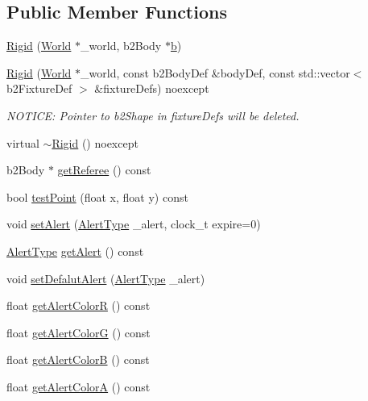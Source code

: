 \subsection*{Public Member Functions}
\begin{DoxyCompactItemize}
\item 
\hyperlink{classRigid_ac249369d4485986e4c637a056be455cf}{Rigid} (\hyperlink{classWorld}{World} $\ast$\+\_\+world, b2\+Body $\ast$\hyperlink{image_8h_ab2d05693952610f937e5acb3c4a8fa1b}{b})
\item 
\hyperlink{classRigid_a0c296ee872fecc99caf4701fd0e23c39}{Rigid} (\hyperlink{classWorld}{World} $\ast$\+\_\+world, const b2\+Body\+Def \&body\+Def, const std\+::vector$<$ b2\+Fixture\+Def $>$ \&fixture\+Defs) noexcept
\begin{DoxyCompactList}\small\item\em N\+O\+T\+I\+C\+E\+: Pointer to b2\+Shape in fixture\+Defs will be deleted. \end{DoxyCompactList}\item 
virtual \hyperlink{classRigid_a33b822e753d001badc4edcd143b02b92}{$\sim$\+Rigid} () noexcept
\item 
b2\+Body $\ast$ \hyperlink{classRigid_a2d8debf925c74a25547cfb1c695d6c7b}{get\+Referee} () const 
\item 
bool \hyperlink{classRigid_a9cb1affc6045f4bb56fb6c5fea51a374}{test\+Point} (float x, float y) const 
\item 
void \hyperlink{classRigid_a331f9af4f9ff0c701bed05c87da1f809}{set\+Alert} (\hyperlink{const_8h_ae57fbba2739adb4045db3bfcf9b249bf}{Alert\+Type} \+\_\+alert, clock\+\_\+t expire=0)
\item 
\hyperlink{const_8h_ae57fbba2739adb4045db3bfcf9b249bf}{Alert\+Type} \hyperlink{classRigid_a82007cd4cea29355f1f34479cd4aae49}{get\+Alert} () const 
\item 
void \hyperlink{classRigid_a1ad83f3f9bb440deef6b5b0c74bd8ff3}{set\+Defalut\+Alert} (\hyperlink{const_8h_ae57fbba2739adb4045db3bfcf9b249bf}{Alert\+Type} \+\_\+alert)
\item 
float \hyperlink{classRigid_ac170efa72277d70b7226d9c333db18a0}{get\+Alert\+Color\+R} () const 
\item 
float \hyperlink{classRigid_af7291b323a2a8e99f82cd51f555950dc}{get\+Alert\+Color\+G} () const 
\item 
float \hyperlink{classRigid_a1b1ade2f2b20d803a17c53e213d45f26}{get\+Alert\+Color\+B} () const 
\item 
float \hyperlink{classRigid_a8ff7adc0eaea76ef6c42d170db2d8a41}{get\+Alert\+Color\+A} () const 

\end{DoxyCompactItemize}
